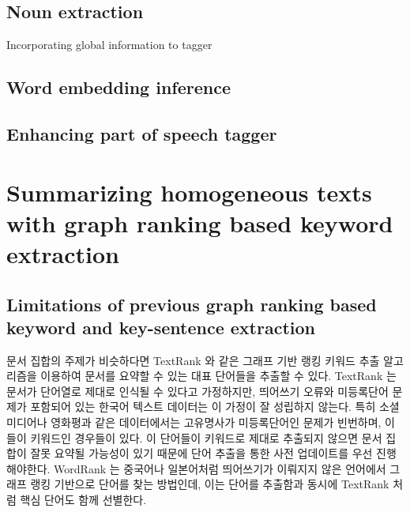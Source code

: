\documentclass[11pt]{article}
\begin{document}
\vspace{3cm}

\subsection{Noun extraction}

Incorporating global information to tagger \citep{zhao2007incorporating} 

\vspace{3cm}


\subsection{Word embedding inference}

\vspace{3cm}

\subsection{Enhancing part of speech tagger}

\vspace{3cm}


\section{Summarizing homogeneous texts with graph ranking based keyword extraction}

\subsection{Limitations of previous graph ranking based keyword and key-sentence extraction}

문서 집합의 주제가 비슷하다면 TextRank \citep{mihalcea2004textrank}와 같은 그래프 기반 랭킹 키워드 추출 알고리즘을 이용하여 문서를 요약할 수 있는 대표 단어들을 추출할 수 있다.
TextRank 는 문서가 단어열로 제대로 인식될 수 있다고 가정하지만, 띄어쓰기 오류와 미등록단어 문제가 포함되어 있는 한국어 텍스트 데이터는 이 가정이 잘 성립하지 않는다.
특히 소셜미디어나 영화평과 같은 데이터에서는 고유명사가 미등록단어인 문제가 빈번하며, 이들이 키워드인 경우들이 있다.
이 단어들이 키워드로 제대로 추출되지 않으면 문서 집합이 잘못 요약될 가능성이 있기 때문에 단어 추출을 통한 사전 업데이트를 우선 진행해야한다.
WordRank \citep{chen2011simple} 는 중국어나 일본어처럼 띄어쓰기가 이뤄지지 않은 언어에서 그래프 랭킹 기반으로 단어를 찾는 방법인데, 이는 단어를 추출함과 동시에 TextRank 처럼 핵심 단어도 함께 선별한다.
\end{document}
